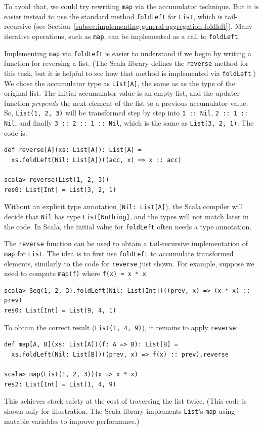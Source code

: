 To avoid that, we could try rewriting \lstinline!map! via the accumulator
technique. But it is easier instead to use the standard method \lstinline!foldLeft!
for \lstinline!List!, which is tail-recursive (see Section~\ref{subsec:implementing-general-aggregation-foldleft}).
Many iterative operations, such as \lstinline!map!, can be implemented
as a call to \lstinline!foldLeft!.

Implementing \lstinline!map! via \lstinline!foldLeft! is easier
to understand if we begin by writing a function for reversing a list.
(The Scala library defines the \lstinline!reverse! method for this
task, but it is helpful to see how that method is implemented via
\lstinline!foldLeft!.) We chose the accumulator type as \lstinline!List[A]!,
the same as as the type of the original list. The initial accumulator
value is an empty list, and the updater function \emph{prepends} the
next element of the list to a previous accumulator value. So, \lstinline!List(1, 2, 3)!
will be transformed step by step into \lstinline!1 :: Nil!, \lstinline!2 :: 1 :: Nil!,
and finally \lstinline!3 :: 2 :: 1 :: Nil!, which is the same as
\lstinline!List(3, 2, 1)!. The code is:
\begin{lstlisting}
def reverse[A](xs: List[A]): List[A] =
  xs.foldLeft(Nil: List[A])((acc, x) => x :: acc)

scala> reverse(List(1, 2, 3))
res0: List[Int] = List(3, 2, 1) 
\end{lstlisting}
Without an explicit type annotation (\lstinline!Nil: List[A]!), the
Scala compiler will decide that \lstinline!Nil! has type \lstinline!List[Nothing]!,
and the types will not match later in the code. In Scala, the initial
value for \lstinline!foldLeft! often needs a type annotation.

The \lstinline!reverse! function can be used to obtain a tail-recursive
implementation of \lstinline!map! for \lstinline!List!. The idea
is to first use \lstinline!foldLeft! to accumulate transformed elements,
similarly to the code for \lstinline!reverse! just shown. For example,
suppose we need to compute \lstinline!map(f)! where \lstinline!f(x) = x * x!:
\begin{lstlisting}
scala> Seq(1, 2, 3).foldLeft(Nil: List[Int])((prev, x) => (x * x) :: prev)
res0: List[Int] = List(9, 4, 1)
\end{lstlisting}
To obtain the correct result (\lstinline!List(1, 4, 9)!), it remains
to apply \lstinline!reverse!:
\begin{lstlisting}
def map[A, B](xs: List[A])(f: A => B): List[B] =
  xs.foldLeft(Nil: List[B])((prev, x) => f(x) :: prev).reverse

scala> map(List(1, 2, 3))(x => x * x)
res2: List[Int] = List(1, 4, 9)
\end{lstlisting}
This achieves stack safety at the cost of traversing the list twice.
(This code is shown only for illustration. The Scala library implements
\lstinline!List!\textsf{'}s \lstinline!map! using mutable variables to improve
performance.)

